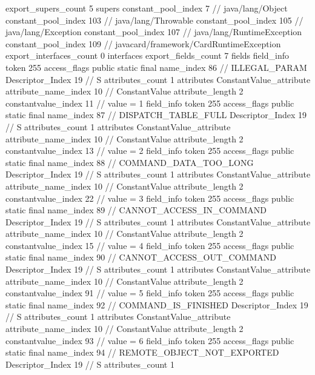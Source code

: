 {{{			export_supers_count	5
			supers {
				constant_pool_index	7		// java/lang/Object
				constant_pool_index	103		// java/lang/Throwable
				constant_pool_index	105		// java/lang/Exception
				constant_pool_index	107		// java/lang/RuntimeException
				constant_pool_index	109		// javacard/framework/CardRuntimeException
			}
			export_interfaces_count	0
			interfaces {
			}
			export_fields_count	7
			fields {
			field_info {
				token	255
				access_flags	public static final
				name_index	86		// ILLEGAL_PARAM
				Descriptor_Index	19		// S
				attributes_count	1
				attributes {
				ConstantValue_attribute {
					attribute_name_index	10		// ConstantValue
					attribute_length	2
					constantvalue_index	11		// value = 1
				}
				}
			}
			field_info {
				token	255
				access_flags	public static final
				name_index	87		// DISPATCH_TABLE_FULL
				Descriptor_Index	19		// S
				attributes_count	1
				attributes {
				ConstantValue_attribute {
					attribute_name_index	10		// ConstantValue
					attribute_length	2
					constantvalue_index	13		// value = 2
				}
				}
			}
			field_info {
				token	255
				access_flags	public static final
				name_index	88		// COMMAND_DATA_TOO_LONG
				Descriptor_Index	19		// S
				attributes_count	1
				attributes {
				ConstantValue_attribute {
					attribute_name_index	10		// ConstantValue
					attribute_length	2
					constantvalue_index	22		// value = 3
				}
				}
			}
			field_info {
				token	255
				access_flags	public static final
				name_index	89		// CANNOT_ACCESS_IN_COMMAND
				Descriptor_Index	19		// S
				attributes_count	1
				attributes {
				ConstantValue_attribute {
					attribute_name_index	10		// ConstantValue
					attribute_length	2
					constantvalue_index	15		// value = 4
				}
				}
			}
			field_info {
				token	255
				access_flags	public static final
				name_index	90		// CANNOT_ACCESS_OUT_COMMAND
				Descriptor_Index	19		// S
				attributes_count	1
				attributes {
				ConstantValue_attribute {
					attribute_name_index	10		// ConstantValue
					attribute_length	2
					constantvalue_index	91		// value = 5
				}
				}
			}
			field_info {
				token	255
				access_flags	public static final
				name_index	92		// COMMAND_IS_FINISHED
				Descriptor_Index	19		// S
				attributes_count	1
				attributes {
				ConstantValue_attribute {
					attribute_name_index	10		// ConstantValue
					attribute_length	2
					constantvalue_index	93		// value = 6
				}
				}
			}
			field_info {
				token	255
				access_flags	public static final
				name_index	94		// REMOTE_OBJECT_NOT_EXPORTED
				Descriptor_Index	19		// S
				attributes_count	1
}}}}}
